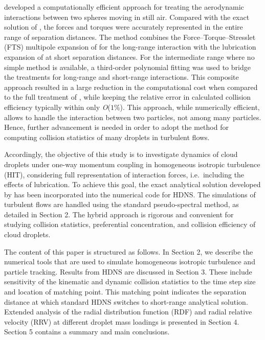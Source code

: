 \documentclass[../thesis.tex]{subfiles}
\begin{document}
\cite{RWMG11} developed a computationally efficient approach for treating the aerodynamic interactions between two spheres moving in still air. Compared with the exact solution of \cite{JO84}, the forces and torques were accurately represented in the entire range of separation distances. The method combines the Force--Torque--Stresslet (FTS) multipole expansion of \cite{DBB87} for the long-range interaction with the lubrication expansion of \cite{JO84} at short separation distances. For the intermediate range where no simple method is available, a third-order polynomial fitting was used to bridge the treatments for long-range and short-range interactions. This composite approach resulted in a large reduction in the computational cost when compared to the full treatment of \cite{JO84}, while keeping the relative error in calculated collision efficiency typically within only \textit{O}($1\%$). This approach, while numerically efficient, allows to handle the interaction between two particles, not among many particles. Hence, further advancement is needed in order to adopt the method for computing collision statistics of many droplets in turbulent flows.

Accordingly, the objective of this study is to investigate dynamics of cloud droplets under one-way momentum coupling in homogeneous isotropic turbulence (HIT), considering full representation of interaction forces, i.e.\ including the effects of lubrication. To achieve this goal, the exact analytical solution developed by \cite{JO84} has been incorporated into the numerical code for HDNS. The simulations of turbulent flows are handled using the standard pseudo-spectral method, as detailed in Section 2. The hybrid approach is rigorous and convenient for studying collision statistics, preferential concentration, and collision efficiency of cloud droplets.

The content of this paper is structured as follows. In Section 2, we describe the numerical tools that are used to simulate homogeneous isotropic turbulence and particle tracking. Results from HDNS are discussed in Section 3. These include sensitivity of the kinematic and dynamic collision statistics to the time step size and location of matching point. This matching point indicates the separation distance at which standard HDNS switches to short-range analytical solution. Extended analysis of the radial distribution function (RDF) and radial relative velocity (RRV) at different droplet mass loadings is presented in Section 4. Section 5 contains a summary and main conclusions.
\end{document}
